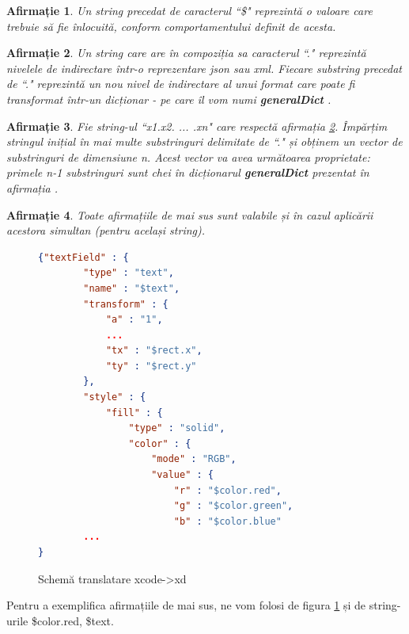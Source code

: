 \newtheorem{mydef}{Afirmație}[chapter]
\newtheorem{myNote}{Notă}[chapter]

\begin{mydef}\label{dollar}
Un string precedat de caracterul ``\$" reprezintă o valoare care trebuie să fie înlocuită, conform comportamentului definit de acesta.
\end{mydef}

\begin{mydef}\label{dot}
Un string care are în compoziția sa caracterul ``." reprezintă nivelele de indirectare într-o reprezentare json sau xml. Fiecare substring precedat de ``." reprezintă un nou nivel de indirectare al unui format care poate fi transformat într-un dicționar - pe care îl vom numi \textbf{generalDict} .
\end{mydef}

\begin{mydef}\label{count}
Fie string-ul ``x1.x2. ... .xn" care respectă afirmația \ref{dot}. Împărțim stringul inițial în mai multe substringuri delimitate de ``." și obținem un vector de substringuri de dimensiune n. Acest vector va avea următoarea proprietate: primele n-1 substringuri sunt chei în dicționarul \textbf{generalDict} prezentat în afirmația \label{dot}. 
\end{mydef}

\begin{mydef}
Toate afirmațiile de mai sus sunt valabile și în cazul aplicării acestora simultan (pentru același string).
\end{mydef}

\begin{figure}[!htbp]
\begin{lstlisting}[language=json,firstnumber=1]
{"textField" : {
        "type" : "text",
        "name" : "$text",
        "transform" : {
            "a" : "1",
            ...
            "tx" : "$rect.x",
            "ty" : "$rect.y"
        },
        "style" : {
            "fill" : {
                "type" : "solid",
                "color" : {
                    "mode" : "RGB",
                    "value" : {
                        "r" : "$color.red",
                        "g" : "$color.green",
                        "b" : "$color.blue"
        ...
}

\end{lstlisting}
\caption{Schemă translatare xcode->xd} \label{fig:XCode2XD Schema}
\end{figure}

Pentru a exemplifica afirmațiile de mai sus, ne vom folosi de figura \ref{fig:XCode2XD Schema} și de string-urile \$color.red, \$text. 

